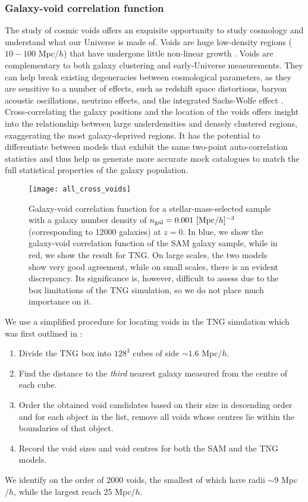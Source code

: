 \documentclass[fleqn,usenatbib]{mnras}
\begin{document}
\subsubsection{Galaxy-void correlation function}

The study of cosmic voids offers an exquisite opportunity to study cosmology and understand what our Universe is made of. Voids are huge low-density regions ($10 - 100$ Mpc$/h$) that have undergone little non-linear growth  \citep{1978ApJ...222..784G}. Voids are complementary to both galaxy clustering and early-Universe measurements. They can help break existing degeneracies between cosmological parameters, as they are sensitive to a number of effects, such as redshift space distortions, baryon acoustic oscillations, neutrino effects, and the integrated Sachs-Wolfe effect \citep[e.g.]{2019MNRAS.488.4413K}. Cross-correlating the galaxy positions and the location of the voids offers insight into the relationship between large underdensities and densely clustered regions, exaggerating the most galaxy-deprived regions. It has the potential to differentiate between models that exhibit the same two-point auto-correlation statistics and thus help us generate more accurate mock catalogues to match the full statistical properties of the galaxy population.

\begin{figure}
\centering  
\texttt{[image: all\_cross\_voids]}
\caption{Galaxy-void correlation function for a stellar-mass-selected sample with a galaxy number density of $n_{\rm gal} = 0.001 \ [{\rm Mpc}/h]^{-3}$ (corresponding to 12000 galaxies) at $z = 0$. In blue, we show the galaxy-void correlation function of the SAM galaxy sample, while in red, we show the result for TNG. On large scales, the two models show very good agreement, while on small scales, there is an evident discrepancy. Its significance is, however, difficult to assess due to the box limitations of the TNG simulation, so we do not place much importance on it.}
\label{fig:all_cross_voids}
\end{figure}

We use a simplified procedure for locating voids in the TNG simulation which was first outlined in \citet{2021MNRAS.501.1603H}:
\begin{enumerate}
\item Divide the TNG box into $128^3$ cubes of side $\sim 1.6$ Mpc$/h$.
\item Find the distance to the {\it third} nearest galaxy measured from the centre of each cube.
\item Order the obtained void candidates based on their size in descending order and for each object in the list, remove all voids whose centres lie within the boundaries of that object.
\item Record the void sizes and void centres for both the SAM and the TNG models.
\end{enumerate}
We identify on the order of 2000 voids, the smallest of which have radii $\sim$9 Mpc$/h$, while the largest reach 25 Mpc$/h$.
\end{document}
